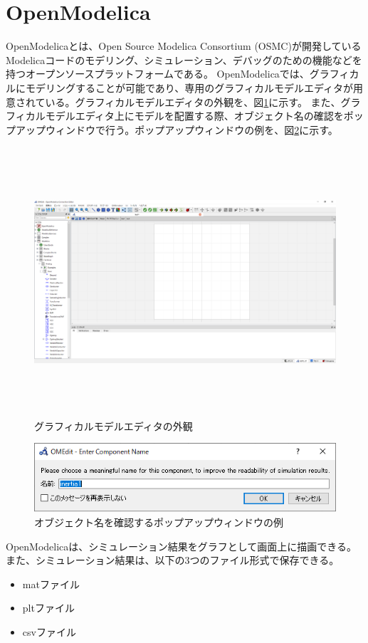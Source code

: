 \section{OpenModelica}\label{OM}
OpenModelicaとは、Open Source Modelica Consortium (OSMC)が開発しているModelicaコードのモデリング、シミュレーション、デバッグのための機能などを
持つオープンソースプラットフォームである\cite{fritzson2006openmodelica}。
OpenModelicaでは、グラフィカルにモデリングすることが可能であり、専用のグラフィカルモデルエディタが用意されている。グラフィカルモデルエディタの外観を、図\ref{fig:OM_GUI}に示す。
また、グラフィカルモデルエディタ上にモデルを配置する際、オブジェクト名の確認をポップアップウィンドウで行う。ポップアップウィンドウの例を、図\ref{fig:name_ob}に示す。
\begin{figure}[t]
	\centering
	\includegraphics[width=16.5cm,height=10cm]{./Image/OM_GUI.png}
	\caption{グラフィカルモデルエディタの外観}
	\label{fig:OM_GUI}
\end{figure}
\begin{figure}[t]
	\centering
	\includegraphics[width=12cm]{./Image/name_ob.png}
	\caption{オブジェクト名を確認するポップアップウィンドウの例}
	\label{fig:name_ob}
\end{figure}
OpenModelicaは、シミュレーション結果をグラフとして画面上に描画できる。また、シミュレーション結果は、以下の3つのファイル形式で保存できる。
\begin{itemize}
    \item matファイル
    \item pltファイル
    \item csvファイル
\end{itemize}

